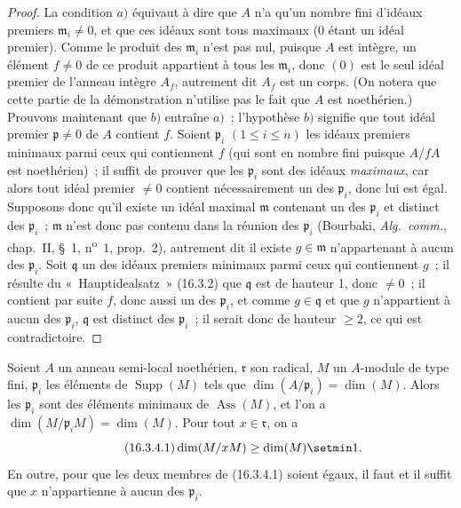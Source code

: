\begin{proof}
La condition $a)$ équivaut à dire que $A$ n'a qu'un nombre fini d'idéaux
premiers $\mathfrak{m}_i\neq0$, et que ces idéaux sont tous maximaux ($0$ étant
un idéal premier). Comme le produit des $\mathfrak{m}_i$ n'est pas nul, puisque
$A$ est intègre, un élément $f\neq0$ de ce produit appartient à tous les
$\mathfrak{m}_i$, donc $(0)$ est le seul idéal premier de l'anneau intègre
$A_f$, autrement dit $A_f$ est un corps. (On notera que cette partie de la
démonstration n'utilise pas le fait que $A$ est noethérien.) Prouvons
maintenant que $b)$ entraîne $a)$~; l'hypothèse $b)$ signifie que tout idéal
premier $\mathfrak{p}\neq0$ de $A$ contient $f$. Soient $\mathfrak{p}_i$
$(1\leq i\leq n)$ les idéaux premiers minimaux parmi ceux qui contiennent $f$
(qui sont en nombre fini puisque $A/fA$ est noethérien)~; il suffit de prouver
que les $\mathfrak{p}_i$ sont des idéaux \emph{maximaux}, car alors tout idéal
premier $\neq0$ contient nécessairement un des $\mathfrak{p}_i$, donc lui est
égal. Supposons donc qu'il existe un idéal maximal $\mathfrak{m}$ contenant un
des $\mathfrak{p}_i$ et distinct des $\mathfrak{p}_i$~; $\mathfrak{m}$ n'est
donc pas contenu dans la réunion des $\mathfrak{p}_i$ (Bourbaki,
\emph{Alg.~comm.}, chap.~II, \S~1, n\textsuperscript{o}~1, prop.~2), autrement dit il existe
$g\in\mathfrak{m}$ n'appartenant à aucun des $\mathfrak{p}_i$. Soit
$\mathfrak{q}$ un des idéaux premiers minimaux parmi ceux qui contiennent
$g$~; il résulte du «~Hauptidealsatz~» (16.3.2) que $\mathfrak{q}$ est de
hauteur 1, donc $\neq0$~; il contient par suite $f$, donc aussi un des
$\mathfrak{p}_i$, et comme $g\in\mathfrak{q}$ et que $g$ n'appartient à aucun
des $\mathfrak{p}_i$, $\mathfrak{q}$ est distinct des $\mathfrak{p}_i$~; il
serait donc de hauteur $\geq2$, ce qui est contradictoire.
\end{proof}

\begin{proposition}[16.3.4]
\label{0.16.3.4-fr}
Soient $A$ un anneau semi-local noethérien, $\mathfrak{r}$ son radical, $M$ un
$A$-module de type fini, $\mathfrak{p}_i$ les éléments de
$\operatorname{Supp}(M)$ tels que
$\dim(A/\mathfrak{p}_i)=\dim(M)$. Alors les $\mathfrak{p}_i$ sont des éléments
minimaux de $\operatorname{Ass}(M)$, et l'on a
$\dim(M/\mathfrak{p}_iM)=\dim(M)$. Pour tout $x\in\mathfrak{r}$, on a
\begin{equation}
\label{0.16.3.4.1-fr}
\tag{16.3.4.1}
  \dim(M/xM)\geq\dim(M)\setmin 1.
\end{equation}
En outre, pour que les deux membres de \textup{(16.3.4.1)} soient égaux, il faut et il
suffit que $x$ n'appartienne à aucun des $\mathfrak{p}_i$.
\end{proposition}

